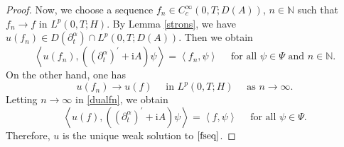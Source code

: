 \documentclass[reqno]{amsart}
\numberwithin{equation}{section}
\begin{document}
\begin{proof}
Now, we choose a sequence $f_n \in C_c^{\infty}(0, T;D(A))$, $n \in \mathbb{N}$ such that $f_n \to f$ in $L^p(0, T;H)$. By Lemma \ref{strons}, we have $u(f_n) \in D(\partial_t^\alpha) \cap L^p(0,T;D(A))$. Then we obtain
\begin{equation}\label{dualfn}
\left\langle u(f_n),\left(\left(\partial_t^\alpha\right)^{\prime}+\mathrm{i}A\right) \psi\right\rangle=\left\langle f_n, \psi\right\rangle \quad \text{ for all } \psi \in \Psi \text{ and } n \in \mathbb{N}.
\end{equation}
On the other hand, one has
$$
u(f_n) \to u(f) \quad\text{ in } L^p(0,T;H) \quad \text{ as } n \rightarrow \infty .
$$
Letting $n \rightarrow \infty$ in \eqref{dualfn}, we obtain
$$
\left\langle u(f),\left(\left(\partial_t^\alpha\right)^{\prime}+\mathrm{i}A\right) \psi\right\rangle=\left\langle f, \psi\right\rangle \quad \text{ for all } \psi \in \Psi.
$$
Therefore, $u$ is the unique weak solution to $\eqref{fseq}$.
\end{proof}
\end{document}
